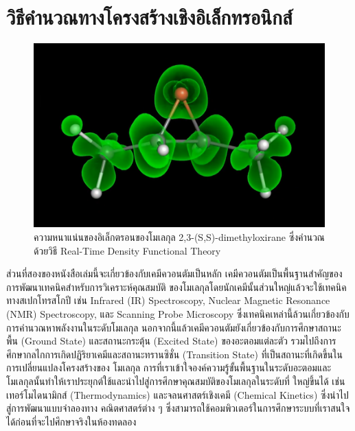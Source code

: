 

\chapter{วิธีคำนวณทางโครงสร้างเชิงอิเล็กทรอนิกส์}
\label{ch:el_strct}

\begin{figure}[htbp]
    \centering
    \includegraphics[width=0.9\linewidth]{fig/electron_density.png}
    \caption{ความหนาแน่นของอิเล็กตรอนของโมเลกุล 2,3-(S,S)-dimethyloxirane ซึ่งคำนวณด้วยวิธี Real-Time Density 
    Functional Theory}
    \label{fig:elec_density}
\end{figure}

ส่วนที่สองของหนังสือเล่มนี้จะเกี่ยวข้องกับเคมีควอนตัมเป็นหลัก เคมีควอนตัมเป็นพื้นฐานสำคัญของการพัฒนาเทคนิคสำหรับการวิเคราะห์คุณสมบัติ%
ของโมเลกุลโดยนักเคมีนั้นส่วนใหญ่แล้วจะใช้เทคนิคทางสเปกโทรสโกปี เช่น Infrared (IR) Spectroscopy, Nuclear Magnetic Resonance 
(NMR) Spectroscopy, และ Scanning Probe Microscopy ซึ่งเทคนิคเหล่านี้ล้วนเกี่ยวข้องกับการคำนวณหาพลังงานในระดับโมเลกุล 
นอกจากนี้แล้วเคมีควอนตัมยังเกี่ยวข้องกับการศึกษาสถานะพื้น (Ground State) และสถานะกระตุ้น (Excited State) ของอะตอมแต่ละตัว 
รวมไปถึงการศึกษากลไกการเกิดปฏิริยาเคมีและสถานะทรานซิชั่น (Transition State) ที่เป็นสถานะที่เกิดขึ้นในการเปลี่ยนแปลงโครงสร้างของ%
โมเลกุล การที่เราเข้าใจองค์ความรู้ขั้นพื้นฐานในระดับอะตอมและโมเลกุลนั้นทำให้เราประยุกต์ใช้และนำไปสู่การศึกษาคุณสมบัติของโมเลกุลในระดับที่%
ใหญ่ขึ้นได้ เช่น เทอร์โมไดนามิกส์ (Thermodynamics) และจลนศาสตร์เชิงเคมี (Chemical Kinetics) ซึ่งนำไปสู่การพัฒนาแบบจำลองทาง%
คณิตศาสตร์ต่าง ๆ ซึ่งสามารถใช้คอมพิวเตอร์ในการศึกษาระบบที่เราสนใจได้ก่อนที่จะไปศึกษาจริงในห้องทดลอง

